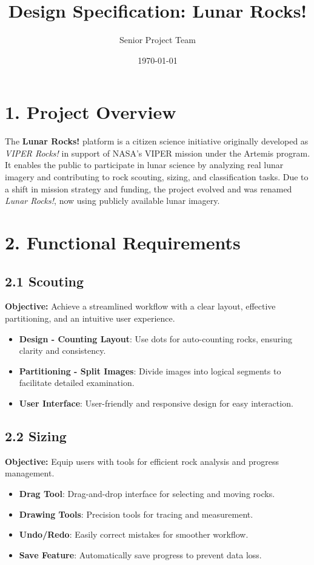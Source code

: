 \documentclass[12pt]{article}
\title{\textbf{Design Specification: Lunar Rocks!}}
\author{Senior Project Team}
\date{\today}
\begin{document}
\maketitle

\section*{1. Project Overview}
The \textbf{Lunar Rocks!} platform is a citizen science initiative originally developed as \textit{VIPER Rocks!} in support of NASA's VIPER mission under the Artemis program. It enables the public to participate in lunar science by analyzing real lunar imagery and contributing to rock scouting, sizing, and classification tasks. Due to a shift in mission strategy and funding, the project evolved and was renamed \textit{Lunar Rocks!}, now using publicly available lunar imagery.

\section*{2. Functional Requirements}
\subsection*{2.1 Scouting}
\textbf{Objective:} Achieve a streamlined workflow with a clear layout, effective partitioning, and an intuitive user experience.
\begin{itemize}
  \item \textbf{Design - Counting Layout}: Use dots for auto-counting rocks, ensuring clarity and consistency.
  \item \textbf{Partitioning - Split Images}: Divide images into logical segments to facilitate detailed examination.
  \item \textbf{User Interface}: User-friendly and responsive design for easy interaction.
\end{itemize}

\subsection*{2.2 Sizing}
\textbf{Objective:} Equip users with tools for efficient rock analysis and progress management.
\begin{itemize}
  \item \textbf{Drag Tool}: Drag-and-drop interface for selecting and moving rocks.
  \item \textbf{Drawing Tools}: Precision tools for tracing and measurement.
  \item \textbf{Undo/Redo}: Easily correct mistakes for smoother workflow.
  \item \textbf{Save Feature}: Automatically save progress to prevent data loss.
\end{itemize}
\end{document}
